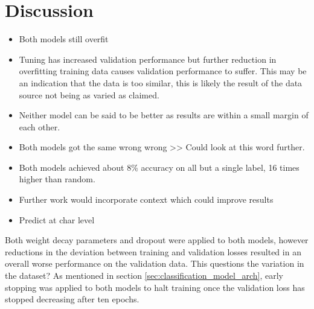 \section{Discussion}
\begin{itemize}
   \item Both models still overfit 
   \item Tuning has increased validation performance but further reduction in overfitting training data causes validation performance to suffer.
   This may be an indication that the data is too similar, this is likely the result of the data source not being as varied as claimed.
   \item Neither model can be said to be better as results are within a small margin of each other. 
   \item Both models got the same wrong wrong >> Could look at this word further.
   \item Both models achieved about 8\% accuracy on all but a single label, 16 times higher than random.
   \item Further work would incorporate context which could improve results
   \item Predict at char level
\end{itemize}
Both weight decay parameters and dropout were applied to both models, however reductions in the deviation between training and validation losses resulted in an overall worse performance on the validation data.
This questions the variation in the dataset?
As mentioned in section \ref{sec:classification_model_arch}, early stopping was applied to both models to halt training once the validation loss has stopped decreasing after ten epochs.